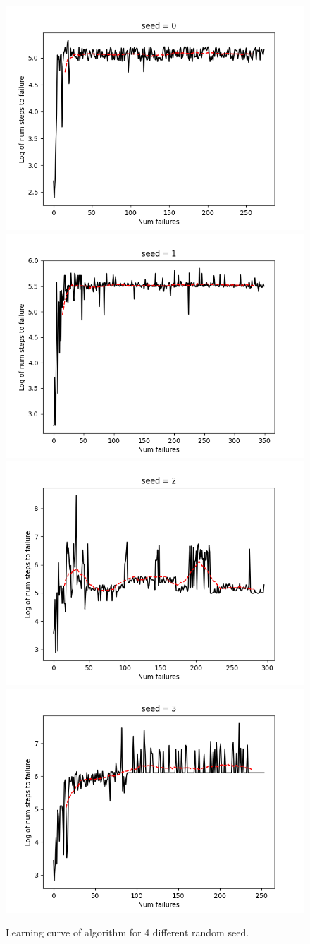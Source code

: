 \documentclass[12pt,letterpaper,boxed]{hmcpset}
\begin{document}
\begin{solution}
\begin{enumerate}[(a)]
    \begin{figure}
      \includegraphics[width=0.5\linewidth]{src/output/control_0.png}
      \includegraphics[width=0.5\linewidth]{src/output/control_1.png}
      \includegraphics[width=0.5\linewidth]{src/output/control_2.png}
      \includegraphics[width=0.5\linewidth]{src/output/control_3.png}
      \caption{Learning curve of algorithm for 4 different random seed.}
      \label{learning-curve}
    \end{figure}
  \end{enumerate}
\end{solution}
\end{document}

